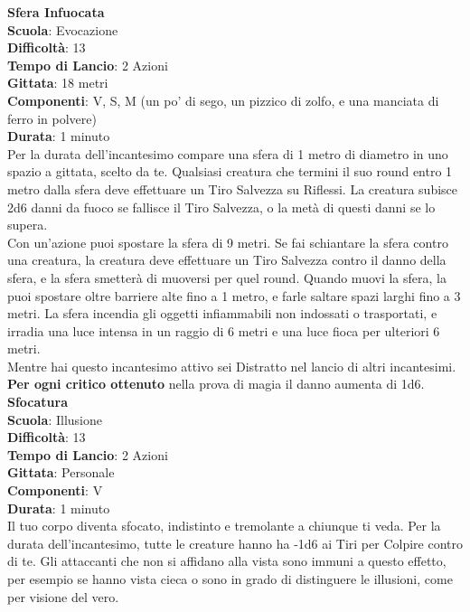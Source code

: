 \begin{multicols}{2}
\medskip\textbf{Sfera Infuocata}\\
\textbf{Scuola}: Evocazione\\
\textbf{Difficoltà}: 13\\
\textbf{Tempo di Lancio}: 2 Azioni\\
\textbf{Gittata}: 18 metri\\
\textbf{Componenti}: V, S, M (un po' di sego, un pizzico di zolfo, e una manciata di ferro in polvere)\\
\textbf{Durata}: 1 minuto\\
Per la durata dell'incantesimo compare una sfera di 1 metro di diametro in uno spazio a gittata, scelto da te. Qualsiasi creatura che termini il suo round entro 1 metro dalla sfera deve effettuare un Tiro Salvezza su Riflessi. La creatura subisce 2d6 danni da fuoco se fallisce il Tiro Salvezza, o la metà di questi danni se lo supera.\\
Con un'azione puoi spostare la sfera di 9 metri. Se fai schiantare la sfera contro una creatura, la creatura deve effettuare un Tiro Salvezza contro il danno della sfera, e la sfera smetterà di muoversi per quel round.
Quando muovi la sfera, la puoi spostare oltre barriere alte fino a 1 metro, e farle saltare spazi larghi fino a 3 metri. La sfera incendia gli oggetti infiammabili non indossati o trasportati, e irradia una luce intensa in un raggio di 6 metri e una luce fioca per ulteriori 6 metri.\\
Mentre hai questo incantesimo attivo sei Distratto nel lancio di altri incantesimi.\\
\textbf{Per ogni critico ottenuto} nella prova di magia il danno aumenta di 1d6.\\

\medskip\textbf{Sfocatura}\\
\textbf{Scuola}: Illusione\\
\textbf{Difficoltà}: 13\\
\textbf{Tempo di Lancio}: 2 Azioni\\
\textbf{Gittata}: Personale\\
\textbf{Componenti}: V\\
\textbf{Durata}: 1 minuto \\
Il tuo corpo diventa sfocato, indistinto e tremolante a chiunque ti veda. Per la durata dell'incantesimo, tutte le creature hanno ha -1d6 ai Tiri per Colpire contro di te. Gli attaccanti che non si affidano alla vista sono immuni a questo effetto, per esempio se hanno vista cieca o sono in grado di distinguere le illusioni, come per visione del vero.


\end{multicols}
